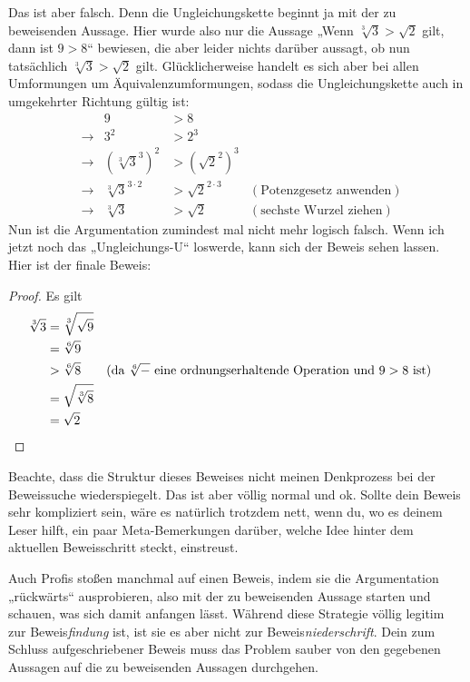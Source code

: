 \begin{bem}
    Das ist aber falsch. Denn die Ungleichungskette beginnt ja mit der zu beweisenden Aussage. Hier wurde also nur die Aussage „Wenn $\sqrt[3]{3} >\sqrt{2}$ gilt, dann ist $9>8$“ bewiesen, die aber leider nichts darüber aussagt, ob nun tatsächlich $\sqrt[3]{3} >\sqrt{2}$ gilt. Glücklicherweise handelt es sich aber bei allen Umformungen um Äquivalenzumformungen, sodass die Ungleichungskette auch in umgekehrter Richtung gültig ist:
    \begin{align*}
        && 9 & > 8 \\
        & \to & 3^2 & > 2^3 \\
        & \to & (\sqrt[3]{3}^3)^2 & > (\sqrt{2}^2)^3 \\
        & \to& \sqrt[3]{3}^{3\cdot 2} & > \sqrt{2}^{2\cdot 3} & (\text{Potenzgesetz anwenden}) \\
        &\to &  \sqrt[3]{3}& >\sqrt{2}  & (\text{sechste Wurzel ziehen})
    \end{align*}
    Nun ist die Argumentation zumindest mal nicht mehr logisch falsch. Wenn ich jetzt noch das „Ungleichungs-U“ loswerde, kann sich der Beweis sehen lassen. Hier ist der finale Beweis:
    \begin{proof}
        Es gilt
        \begingroup
        \allowdisplaybreaks
        \begin{align*}
            \sqrt[3]{3} & = \sqrt[3]{\sqrt{9}} \\
            & = \sqrt[6]{9} \\
            & > \sqrt[6]{8} & (\text{da $\sqrt[6]{-}$ eine ordnungserhaltende Operation und $9>8$ ist}) \\
            & = \sqrt{\sqrt[3]{8}} \\
            & = \sqrt{2} && \qedhere
        \end{align*}
        \endgroup
    \end{proof}
    Beachte, dass die Struktur dieses Beweises nicht meinen Denkprozess bei der Beweissuche wiederspiegelt. Das ist aber völlig normal und ok. Sollte dein Beweis sehr kompliziert sein, wäre es natürlich trotzdem nett, wenn du, wo es deinem Leser hilft, ein paar Meta-Bemerkungen darüber, welche Idee hinter dem aktuellen Beweisschritt steckt, einstreust.
    
    Auch Profis stoßen manchmal auf einen Beweis, indem sie die Argumentation „rückwärts“ ausprobieren, also mit der zu beweisenden Aussage starten und schauen, was sich damit anfangen lässt. Während diese Strategie völlig legitim zur Beweis\emph{findung} ist, ist sie es aber nicht zur Beweis\emph{niederschrift}. Dein zum Schluss aufgeschriebener Beweis muss das Problem sauber von den gegebenen Aussagen auf die zu beweisenden Aussagen durchgehen.
    

\end{bem}
